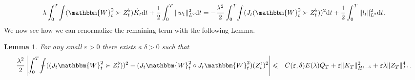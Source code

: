 \documentclass[11pt, oneside]{article}   	%
\newcommand{\mathd}{\mathrm{d}}
\newtheorem{lemma}{Lemma}
\def\Xint#1{\mathchoice
{\XXint\displaystyle\textstyle{#1}}%
{\XXint\textstyle\scriptstyle{#1}}%
{\XXint\scriptstyle\scriptscriptstyle{#1}}%
{\XXint\scriptscriptstyle\scriptscriptstyle{#1}}%
\!\int}
\def\XXint#1#2#3{{\setbox0=\hbox{$#1{#2#3}{\int}$ }
\vcenter{\hbox{$#2#3$ }}\kern-.6\wd0}}
\def\dashint{\Xint-}
\newcommand{\bint}{\dashint}
\begin{document}
\[ \lambda \int_0^T \bint (\mathbbm{W}^2_t \succ Z^{\flat}_t) \dot{K_t}
   \mathd t + \frac{1}{2} \int_0^T \| w_t \|^2_{L^2} \mathd t = -
   \frac{\lambda^2}{2} \int_0^T \bint (J_t (\mathbbm{W}^2_t \succ
   Z^{\flat}_t))^2 \mathd t + \frac{1}{2} \int_0^T \| l_t \|^2_{L^2} \mathd t.
\]
We now see how we can renormalize the remaining term with the following Lemma.

\begin{lemma}
  For any small $\varepsilon > 0$ there exists a $\delta > 0$ such that
  \begin{eqnarray*}
    \frac{\lambda^2}{2} \left| \int^T_0 \bint ((J_t \mathbbm{W}^2_t \succ
    Z^{\flat}_t))^2 - (J_t \mathbbm{W}^2_t \circ J_t \mathbbm{W}^2_t)
    (Z^{\flat}_t)^2 \right| & \leqslant & C (\varepsilon, \delta) E (\lambda)
    Q_T + \varepsilon \| K_T \|^2_{H^{1 - \delta}} + \varepsilon \lambda \|
    Z_T \|^4_{L^4} .
  \end{eqnarray*}
\end{lemma}
\end{document}
